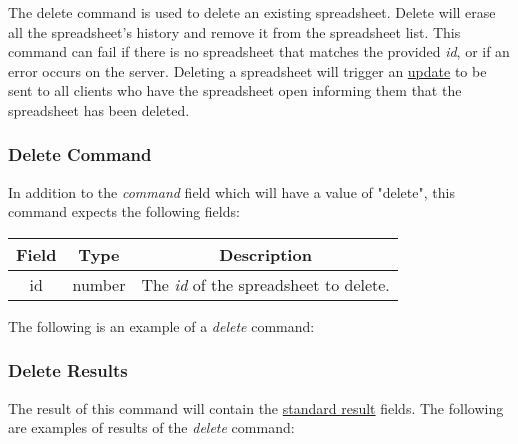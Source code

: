 The delete command is used to delete an existing spreadsheet. Delete will 
erase all the spreadsheet’s history and remove it from the spreadsheet list. 
This command can fail if there is no spreadsheet that matches the provided \emph{id}, 
or if an error occurs on the server. Deleting a spreadsheet will trigger an \hyperref[lst:update:delete]{update} 
to be sent to all clients who have the spreadsheet open informing them that 
the spreadsheet has been deleted.

\subsubsection{Delete Command}
In addition to the \emph{command} field which will have a value of "delete", this command expects the following fields:

\begin{table}[H]
    \begin{center}
        \begin{tabular}{|c|c|c|}\hline
            Field & Type & Description \\\hline
            id & number & The \emph{id} of the spreadsheet to delete. \\\hline
        \end{tabular}
    \end{center}
\end{table}

The following is an example of a \emph{delete} command:



\subsubsection{Delete Results}
The result of this command will contain the \hyperref[sec:message:result]{standard result} fields.
The following are examples of results of the \emph{delete} command:





